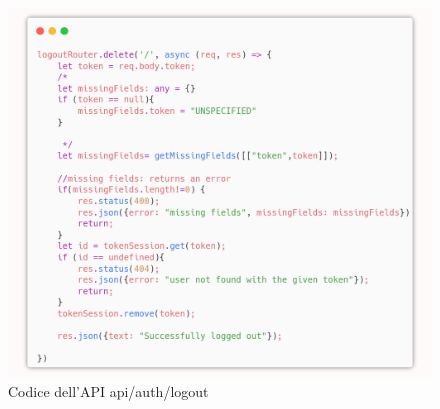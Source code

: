 \documentclass{report}
\begin{document}
\begin{figure}[H]
	\centering\includegraphics[width=1\textwidth]{images/microservizio-autenticazione/logout-carbon.png}
	Codice dell'API api/auth/logout
\end{figure}
\end{document}
